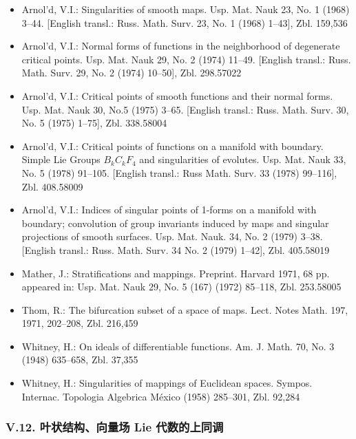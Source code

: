 \begin{itemize}
\item Arnol'd, V.I.: Singularities of smooth maps. Usp. Mat. Nauk 23, No. 1 (1968) 3--44. [English transl.: Russ. Math. Surv. 23, No. 1 (1968) 1--43], Zbl. 159,536
\item Arnol'd, V.I.: Normal forms of functions in the neighborhood of degenerate critical points. Usp. Mat. Nauk 29, No. 2 (1974) 11--49. [English transl.: Russ. Math. Surv. 29, No. 2 (1974) 10--50], Zbl. 298.57022
\item Arnol'd, V.I.: Critical points of smooth functions and their normal forms. Usp. Mat. Nauk 30, No.5 (1975) 3--65. [English transl.: Russ. Math. Surv. 30, No. 5 (1975) 1--75], Zbl. 338.58004
\item Arnol'd, V.I.: Critical points of functions on a manifold with boundary. Simple Lie Groups $B_kC_kF_4$ and singularities of evolutes. Usp. Mat. Nauk 33, No. 5 (1978) 91--105. [English transl.: Russ Math. Surv. 33 (1978) 99--116], Zbl. 408.58009
\item Arnol'd, V.I.: Indices of singular points of 1-forms on a manifold with boundary; convolution of group invariants induced by maps and singular projections of smooth surfaces. Usp. Mat. Nauk. 34, No. 2 (1979) 3--38. [English transl.: Russ. Math. Surv. 34 No. 2 (1979) 1--42], Zbl. 405.58019
\item Mather, J.: Stratifications and mappings. Preprint. Harvard 1971, 68 pp. appeared in: Usp. Mat. Nauk 29, No. 5 (167) (1972) 85--118, Zbl. 253.58005
\item Thom, R.: The bifurcation subset of a space of maps. Lect. Notes Math. 197, 1971, 202--208, Zbl. 216,459
\item Whitney, H.: On ideals of differentiable functions. Am. J. Math. 70, No. 3 (1948) 635--658, Zbl. 37,355
\item Whitney, H.: Singularities of mappings of Euclidean spaces. Sympos. Internac. Topologia Algebrica México (1958) 285--301, Zbl. 92,284
\end{itemize}

\subsubsection*{V.12. 叶状结构、向量场 Lie 代数的上同调}

